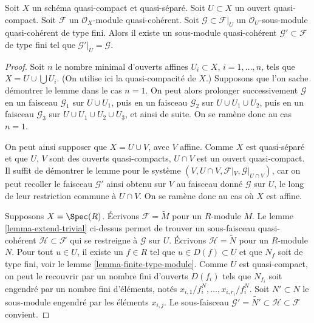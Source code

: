 \begin{lemma}
\label{lemma-extend}
Soit $X$ un schéma quasi-compact et quasi-séparé.
Soit $U \subset X$ un ouvert quasi-compact.
Soit $\mathcal{F}$ un $\mathcal{O}_X$-module quasi-cohérent.
Soit $\mathcal{G} \subset \mathcal{F}|_U$ un
$\mathcal{O}_U$-sous-module quasi-cohérent de type fini. Alors
il existe un sous-module quasi-cohérent $\mathcal{G}' \subset \mathcal{F}$
de type fini tel que $\mathcal{G}'|_U = \mathcal{G}$.
\end{lemma}

\begin{proof}
Soit $n$ le nombre minimal d'ouverts affines $U_i \subset X$,
$i = 1, \ldots , n$, tels que $X = U \cup \bigcup U_i$.
(On utilise ici la quasi-compacité de $X$.) Supposons que
l'on sache démontrer le lemme dans le cas $n = 1$. On peut alors prolonger successivement
$\mathcal{G}$
en un faisceau $\mathcal{G}_1$ sur $U \cup U_1$,
puis en un faisceau $\mathcal{G}_2$ sur $U \cup U_1 \cup U_2$,
puis en un faisceau $\mathcal{G}_3$ sur $U \cup U_1 \cup U_2 \cup U_3$,
et ainsi de suite.
On se ramène donc au cas $n = 1$.

\medskip\noindent
On peut ainsi supposer que $X = U \cup V$, avec $V$ affine.
Comme $X$ est quasi-séparé et que $U$, $V$ sont des ouverts quasi-compacts,
$U \cap V$ est un ouvert quasi-compact. Il suffit de démontrer le
lemme pour le système $(V, U \cap V, \mathcal{F}|_V, \mathcal{G}|_{U \cap V})$,
car on peut recoller le faisceau $\mathcal{G}'$ ainsi obtenu sur $V$
au faisceau donné $\mathcal{G}$ sur $U$, le long de leur restriction commune
à $U \cap V$.
On se ramène donc au cas où $X$ est affine.

\medskip\noindent
Supposons $X = \Spec(R)$. Écrivons $\mathcal{F} = \widetilde M$
pour un $R$-module $M$. Le lemme \ref{lemma-extend-trivial} ci-dessus permet
de trouver un sous-faisceau quasi-cohérent $\mathcal{H} \subset \mathcal{F}$
qui se restreigne à $\mathcal{G}$ sur $U$.
Écrivons $\mathcal{H} = \widetilde N$ pour un $R$-module $N$.
Pour tout $u \in U$, il existe un $f \in R$ tel que
$u \in D(f) \subset U$ et que $N_f$ soit de type fini,
voir le lemme \ref{lemma-finite-type-module}.
Comme $U$ est quasi-compact, on peut le recouvrir par un nombre fini
d'ouverts $D(f_i)$ tels que $N_{f_i}$ soit engendré par
un nombre fini d'éléments, notés $x_{i, 1}/f_i^N, \ldots, x_{i, r_i}/f_i^N$.
Soit $N' \subset N$ le sous-module engendré par les éléments
$x_{i, j}$. Le sous-faisceau
$\mathcal{G}' = \widetilde{N'} \subset \mathcal{H} \subset \mathcal{F}$
convient.
\end{proof}

